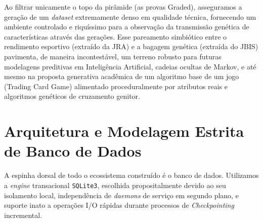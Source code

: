 \documentclass[12pt,a4paper]{article}
\begin{document}
Ao filtrar unicamente o topo da pirâmide (as provas Graded), asseguramos a geração de um \textit{dataset} extremamente denso em qualidade técnica, fornecendo um ambiente controlado e riquíssimo para a observação da transmissão genética de características através das gerações. Esse pareamento simbiótico entre o rendimento esportivo (extraído da JRA) e a bagagem genética (extraída do JBIS) pavimenta, de maneira incontestável, um terreno robusto para futuras modelagens preditivas em Inteligência Artificial, cadeias ocultas de Markov, e até mesmo na proposta generativa acadêmica de um algoritmo base de um jogo (Trading Card Game) alimentado proceduralmente por atributos reais e algoritmos genéticos de cruzamento genitor.

\section{Arquitetura e Modelagem Estrita de Banco de Dados}
A espinha dorsal de todo o ecossistema construído é o banco de dados. Utilizamos a \textit{engine} transacional \texttt{SQLite3}, escolhida propositalmente devido ao seu isolamento local, independência de \textit{daemons} de serviço em segundo plano, e suporte inato a operações I/O rápidas durante processos de \textit{Checkpointing} incremental.
\end{document}
